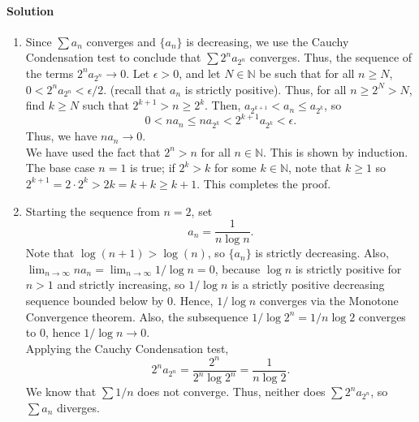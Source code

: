 \documentclass[10pt]{article}
\def\solution{\paragraph{Solution}}
\begin{document}
        \solution
        \begin{enumerate}
                \item Since $\sum a_n$ converges and $\{a_n\}$ is decreasing, we use the Cauchy Condensation test to conclude that
                $\sum 2^n a_{2^n}$ converges. Thus, the sequence of the terms $2^n a_{2^n} \to 0$.
                Let $\epsilon > 0$, and let $N \in \mathbb{N}$ be such that for all $n \geq N$, $0 < 2^n a_{2^n} < \epsilon /2$.
                (recall that $a_n$ is strictly positive). Thus, for all $n \geq 2^N > N$, find $k \geq N$ such that $2^{k + 1} > n \geq 2^k$.
                Then, $a_{2^{k + 1}} < a_{n} \leq a_{2^k}$, so
                \[
                        0 < n a_n \leq n a_{2^k} < 2^{k + 1}a_{2^k} < \epsilon.
                \]
                Thus, we have $n a_n \to 0$. \\

                We have used the fact that $2^n > n$ for all $n \in \mathbb{N}$. This is shown by induction. The base case $n = 1$
                is true; if $2^k > k$ for some $k \in \mathbb{N}$, note that $k \geq 1$ so $2^{k + 1} = 2\cdot 2^k > 2k = k + k \geq k + 1$.
                This completes the proof.

                \item Starting the sequence from $n = 2$, set
                \[
                        a_n = \frac{1}{n\log{n}}.
                \]
                Note that $\log(n + 1) > \log(n)$, so $\{a_n\}$ is strictly decreasing.
                Also, $\lim_{n \to \infty} na_n = \lim_{n \to \infty} 1 / \log{n} = 0$, because $\log{n}$ is strictly positive
                for $n > 1$ and strictly increasing, so $1 /\log{n}$ is a strictly positive decreasing sequence bounded below by 0.
                Hence, $1 /\log{n}$ converges via the Monotone Convergence theorem. Also, the subsequence $1 /\log{2^n} = 1 /n\log{2}$
                converges to 0, hence $1 /\log{n} \to 0$. \\

                Applying the Cauchy Condensation test,
                \[
                       2^n a_{2^n} = \frac{2^n}{2^n \log{2^n}} = \frac{1}{n\log{2}}. 
                \]
                We know that $\sum 1 /n$ does not converge. Thus, neither does $\sum 2^n a_{2^n}$, so $\sum a_n$ diverges.
        \end{enumerate}
\end{document}

